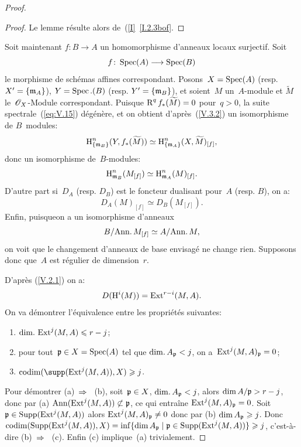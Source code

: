 \begin{proof}
\begin{proof}
Le lemme r\'esulte alors de~(\ref{I}~\ref{I.2.3bof}.
\end{proof}

Soit maintenant $f\colon B\to A$ un homomorphisme d'anneaux locaux surjectif. Soit
$$f\colon\Spec(A)\to\Spec(B)$$
le morphisme de sch\'emas affines correspondant. Posons~$X=\operatorname{Spec}(A)$ (resp.\ $X^{\prime}=\{\mathfrak{m}_{A}\}$), $Y=\operatorname{Spec}.(B)$ (resp. $Y^{\prime}=\{\mathfrak{m}_{B}\}$), et soient~$M$ un~$A$-module et $\widetilde{M}$ le~$\mathscr{O}_X$-Module correspondant. Puisque $\operatorname{R}^{q}f_{\ast}(\widetilde{M})=0$ pour~$q>0$, la suite spectrale~(\ref{eq:V.15}) d\'eg\'en\`ere, et on obtient d'apr\`es~(\ref{V.3.2}) un isomorphisme de $B$~modules:
\begin{equation} \label{eq:V.18} \operatorname{H}_{\{\mathfrak{m}_{B}\} }^{n}(Y, f_{\ast}(\widetilde{M}))\simeq\operatorname{H}_{\{\mathfrak{m}_{A}\} }^{n}(X, \widetilde{M})_{[f]},
\end{equation}
donc un isomorphisme de~$B$-modules:
\begin{equation} \label{eq:V.19} \operatorname{H}_{\mathfrak{m}_{B}}^{n}(M_{[f]})\simeq\operatorname{H}_{\mathfrak{m}_{A}}^{n}(M)_{[f]}.
\end{equation}
D'autre part si~$D_{A}$ (resp. $D_{B}$) est le foncteur dualisant pour~$A$ (resp. $B$), on a:
\begin{equation} \label{eq:V.20} D_{A}(M)_{[f]}\simeq D_{B}(M_{[f]}).
\end{equation}
Enfin, puisqueon a un isomorphisme d'anneaux
\begin{equation} \label{eq:V.21} B/\mathrm{Ann}.\, M_{[f]}\simeq A/\mathrm{Ann}.\, M,
\end{equation}
on voit que le changement d'anneaux de base envisag\'e ne change rien. Supposons donc que~$A$ est r\'egulier de dimension~$r$.

D'apr\`es (\ref{V.2.1}) on a:
\begin{equation} \label{eq:V.22}
D(\operatorname{H}^{i}(M))=\operatorname{Ext}^{r-i}(M, A).
\end{equation}
On va d\'emontrer l'\'equivalence entre les propri\'et\'es suivantes:
\begin{enumerate}
\item[(a)] $\mathrm{dim}.\, \operatorname{Ext}^{j}(M, A)\leqslant r-j$;
\item[(b)] pour tout~$\mathfrak{p}\in X=\operatorname{Spec}(A)$ tel que $\mathrm{dim}.\, A_{\mathfrak{p}}<j$, on a~$\operatorname{Ext}^{j}(M, A)_{\mathfrak{p}}=0$;
\item[(c)] $\codim(\supp(\Ext^{j}(M, A)), X)\geq j$.
\end{enumerate}

Pour d\'emontrer (a)~$\To$~ (b), soit~$\mathfrak{p}\in X$, $\mathrm{dim}.\, A_{\mathfrak{p}}<j$, alors $\dim A/\mathfrak{p}>r-j$, donc par (a) $\operatorname{Ann}(\operatorname{Ext}^{j}(M, A))\not\subset\mathfrak{p}$, ce qui entra\^ine $\operatorname{Ext}^{j}(M, A)_{\mathfrak{p}}=0$. Soit~$\mathfrak{p}\in\operatorname{Supp}(\operatorname{Ext}^{j}(M, A))$ alors $\operatorname{Ext}^{j}(M, A)_{\mathfrak{p}}\neq 0$ donc par (b) $\dim A_{\mathfrak{p}}\geqslant j$. Donc $\operatorname{codim}(\operatorname{Supp}(\operatorname{Ext}^{j}(M, A)), X)=\inf\{ \dim A_{\mathfrak{p}}\mid \mathfrak{p}\in\operatorname{Supp}(\operatorname{Ext}^{j}(M, A))\} \geqslant j$, c'est-\`a-dire (b)~$\To$~ (c). Enfin (c) implique~(a) trivialement.


\end{proof}
